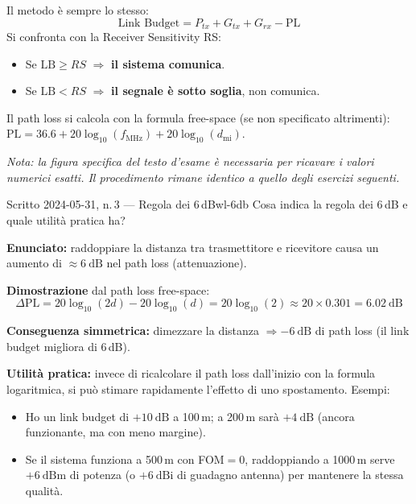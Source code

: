 \documentclass{report}
\begin{document}
\begin{solution}
Il metodo è sempre lo stesso:
\[
  \text{Link Budget} = P_{tx} + G_{tx} + G_{rx} - \text{PL}
\]
Si confronta con la Receiver Sensitivity RS:
\begin{itemize}
  \item Se $\text{LB} \geq RS$ $\Rightarrow$ \textbf{il sistema comunica}.
  \item Se $\text{LB} < RS$ $\Rightarrow$ \textbf{il segnale è sotto soglia}, non comunica.
\end{itemize}

Il path loss si calcola con la formula free-space (se non specificato altrimenti):
$\text{PL} = 36.6 + 20\log_{10}(f_{\text{MHz}}) + 20\log_{10}(d_{\text{mi}})$.

\medskip
\emph{Nota: la figura specifica del testo d'esame è necessaria per ricavare i
valori numerici esatti. Il procedimento rimane identico a quello degli esercizi
seguenti.}
\end{solution}

\begin{Exercise}{Scritto 2024-05-31, n.\,3 --- Regola dei 6\,dB}{wl-6db}
Cosa indica la regola dei 6\,dB e quale utilità pratica ha?
\end{Exercise}

\begin{solution}
\textbf{Enunciato:} raddoppiare la distanza tra trasmettitore e ricevitore causa
un aumento di $\approx6\ \text{dB}$ nel path loss (attenuazione).

\medskip
\textbf{Dimostrazione} dal path loss free-space:
\[
  \Delta\text{PL} = 20\log_{10}(2d) - 20\log_{10}(d) = 20\log_{10}(2) \approx 20 \times 0.301 = 6.02\ \text{dB}
\]

\textbf{Conseguenza simmetrica:} dimezzare la distanza $\Rightarrow -6\ \text{dB}$
di path loss (il link budget migliora di 6\,dB).

\medskip
\textbf{Utilità pratica:} invece di ricalcolare il path loss dall'inizio con la
formula logaritmica, si può stimare rapidamente l'effetto di uno spostamento.
Esempi:
\begin{itemize}
  \item Ho un link budget di $+10\ \text{dB}$ a 100\,m; a 200\,m sarà $+4\ \text{dB}$
        (ancora funzionante, ma con meno margine).
  \item Se il sistema funziona a 500\,m con FOM$=0$, raddoppiando a 1000\,m serve
        $+6\ \text{dBm}$ di potenza (o $+6\ \text{dBi}$ di guadagno antenna) per
        mantenere la stessa qualità.
\end{itemize}
\end{solution}
\end{document}

